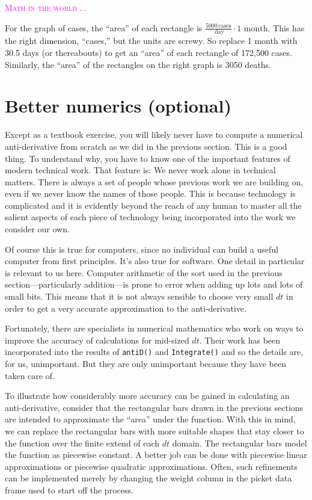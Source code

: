 \documentclass[
  letterpaper,
  DIV=11,
  numbers=noendperiod,
  oneside]{scrreprt}
\newenvironment{intheworld}%
{%
\textcolor{magenta}{\hrulefill}%
  \par\vspace{.3\baselineskip}%
  \textcolor{magenta}{\scshape Math in the world ...}%
  \par\vspace{\baselineskip}%
}%
{\textcolor{magenta}{\hrulefill}}
\begin{document}
\begin{intheworld}
\begin{figure}
{}

\end{figure}

For the graph of cases, the ``area'' of each rectangle is
\(\frac{5000\, \text{cases}}{\text{ day}}\cdot \text{1 month}\). This
has the right dimension, ``cases,'' but the units are screwy. So replace
1 month with 30.5 days (or thereabouts) to get an ``area'' of each
rectangle of 172,500 cases. Similarly, the ``area'' of the rectangles on
the right graph is 3050 deaths.

\end{intheworld}

\hypertarget{better-numerics-optional}{%
\section{Better numerics (optional)}\label{better-numerics-optional}}

Except as a textbook exercise, you will likely never have to compute a
numerical anti-derivative from scratch as we did in the previous
section. This is a good thing. To understand why, you have to know one
of the important features of modern technical work. That feature is: We
never work alone in technical matters. There is always a set of people
whose previous work we are building on, even if we never know the names
of those people. This is because technology is complicated and it is
evidently beyond the reach of any human to master all the salient
aspects of each piece of technology being incorporated into the work we
consider our own.

Of course this is true for computers, since no individual can build a
useful computer from first principles. It's also true for software. One
detail in particular is relevant to us here. Computer arithmetic of the
sort used in the previous section---particularly addition---is prone to
error when adding up lots and lots of small bits. This means that it is
not always sensible to choose very small \(dt\) in order to get a very
accurate approximation to the anti-derivative.

Fortunately, there are specialists in numerical mathematics who work on
ways to improve the accuracy of calculations for mid-sized \(dt\). Their
work has been incorporated into the results of \texttt{antiD()} and
\texttt{Integrate()} and so the details are, for us, unimportant. But
they are only unimportant because they have been taken care of.

To illustrate how considerably more accuracy can be gained in
calculating an anti-derivative, consider that the rectangular bars drawn
in the previous sections are intended to approximate the ``area'' under
the function. With this in mind, we can replace the rectangular bars
with more suitable shapes that stay closer to the function over the
finite extend of each \(dt\) domain. The rectangular bars model the
function as piecewise constant. A better job can be done with piecewise
linear approximations or piecewise quadratic approximations. Often, such
refinements can be implemented merely by changing the weight column in
the picket data frame used to start off the process.
\end{document}
